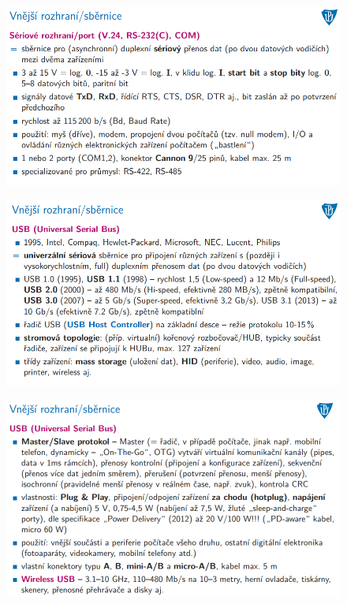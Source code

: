 \documentclass[10pt,a4paper]{article}
\begin{document}
\begin{figure} [h]
	\includegraphics[scale=0.65]{img/prvni_odstavec/otazka4/rozhrani_vnejsi3.png}	
\end{figure}

\begin{figure} [h]
	\includegraphics[scale=0.65]{img/prvni_odstavec/otazka4/rozhrani_vnejsi4.png}	
\end{figure}

\begin{figure} [h]
	\includegraphics[scale=0.65]{img/prvni_odstavec/otazka4/rozhrani_vnejsi5.png}	
\end{figure}
\end{document}
